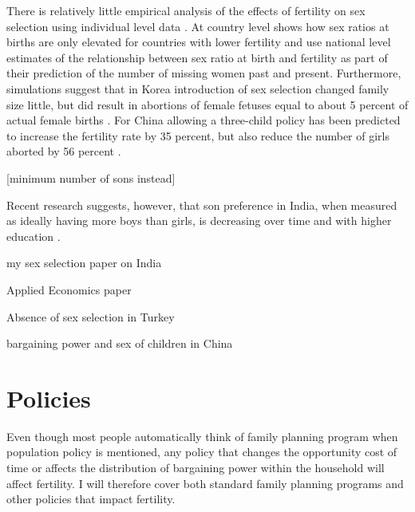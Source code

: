 \documentclass[letterpaper,12pt]{article}
\begin{document}
There is relatively little empirical analysis of the effects of fertility 
on sex selection using individual level data \citep{park95,Ebenstein2011}.
At country level \citet{Bongaarts2013} shows how sex ratios at births are 
only elevated for countries with lower fertility and
\citet{Bongaarts2015} use national level estimates of the relationship
between sex ratio at birth and fertility as part of their
prediction of the number of missing women past and present.
Furthermore, simulations suggest that in Korea introduction of sex selection
changed family size little, but did result in abortions
of female fetuses equal to about 5 percent of actual female
births \citep{park95}.
For China allowing a three-child policy has been predicted to 
increase the fertility rate by 35 percent, but also reduce the
number of girls aborted by 56 percent \citep{Ebenstein2011}.


\citep{Jayachandran2017}

[minimum number of sons instead]

Recent research suggests, however, that son preference in India, when measured as 
ideally having more boys than girls, is decreasing over time and with higher 
education \citep{bhat03,pande07}.



my sex selection paper on India

Applied Economics paper

Absence of sex selection in Turkey
\citet{Altindag2016}

bargaining power and sex of children in China \citet{Li2011}


\section{Policies}

Even though most people automatically think of family planning
program when population policy is mentioned, any policy that changes 
the opportunity cost of time or affects the distribution of
bargaining power within the household will affect fertility.
I will therefore cover both standard family planning programs
and other policies that impact fertility.
\end{document}
